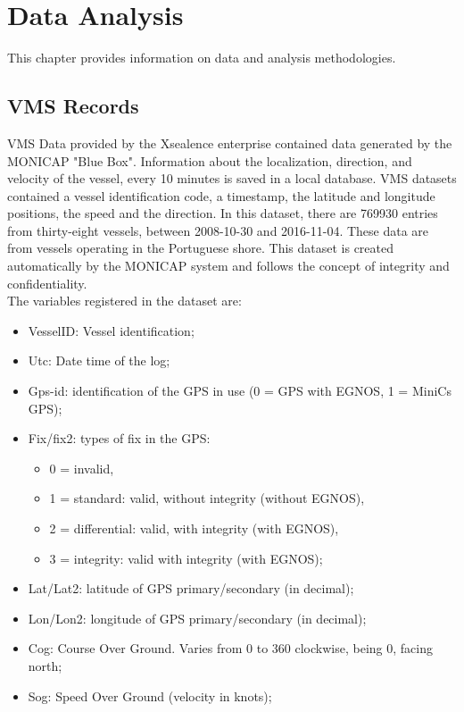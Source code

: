 % 
% 
%
\chapter{Data Analysis}
\label{cha:data}
This chapter provides information on data and analysis methodologies.



\section{VMS Records} %
\label{sec:vms_records}

VMS Data provided by the Xsealence \cite{WEBSITE:Xsealence} enterprise contained data generated by the MONICAP \cite{WEBSITE:MonicapXsealence} "Blue Box". Information about the localization, direction, and velocity of the vessel, every 10 minutes is saved in a local database. VMS datasets contained a vessel identification code, a timestamp, the latitude and longitude positions, the speed and the direction. In this dataset, there are 769930 entries from thirty-eight vessels, between 2008-10-30 and 2016-11-04. These data are from vessels operating in the Portuguese shore. 
This dataset is created automatically by the MONICAP system and follows the concept of integrity and confidentiality.\\
The variables registered in the dataset are:
\begin{itemize}
\item VesselID: Vessel identification;
\item Utc: Date time of the log;
\item Gps-id: identification of the GPS in use (0 = GPS with EGNOS, 1 = MiniCs GPS);
\item Fix/fix2: types of fix in the GPS:
\begin{itemize}
\item 0 = invalid, 
\item 1 = standard: valid, without integrity (without EGNOS), 
\item 2 = differential: valid, with integrity (with EGNOS), 
\item 3 = integrity: valid with integrity (with EGNOS);
\end{itemize}
\item Lat/Lat2: latitude of GPS primary/secondary (in decimal);
\item Lon/Lon2: longitude of GPS primary/secondary (in decimal);
\item Cog: Course Over Ground. Varies from 0 to 360 clockwise, being 0, facing north;
\item Sog: Speed Over Ground (velocity in knots);


\end{itemize}


